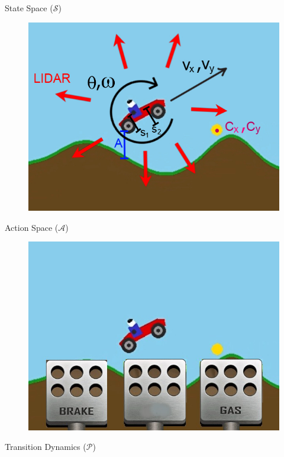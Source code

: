 \documentclass[serif]{beamer}  %
\begin{document}
    \begin{frame}{State Space ($\mathcal{S}$)}
        \begin{figure}
            \centering
            \includegraphics[width=0.8\linewidth]{images/state_space.jpg}
        \end{figure}
    \end{frame}

    \begin{frame}{Action Space ($\mathcal{A}$)}
        \begin{figure}
            \centering
            \includegraphics[width=0.8\linewidth]{images/action_space.jpg}
        \end{figure}
    \end{frame}

    \begin{frame}{Transition Dynamics ($\mathcal{P}$)}
        
    \end{frame}
\end{document}
